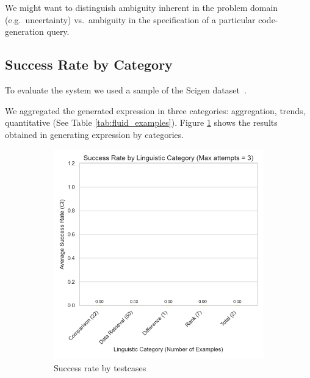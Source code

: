 We might want to distinguish ambiguity inherent in the problem domain (e.g.~uncertainty) vs.~ambiguity in the
specification of a particular code-generation query.

\subsection{Success Rate by Category}
To evaluate the system we used a sample of the Scigen dataset~\citep{scigen_dataset_2021}.

We aggregated the generated expression in three categories: aggregation, trends, quantitative (See Table \ref{tab:fluid_examples}).
Figure \ref{fig:success_rate_by_category} shows the results obtained in generating expression by categories.

\begin{figure}
    \centering
    \begin{subfigure}{0.48\linewidth}
        \centering
        \includegraphics[width=\linewidth]{fig/success_rate_by_category}
        \caption{Success rate by testcases}
        \label{fig:success_rate_by_category}
    \end{subfigure}\hfill
    \begin{subfigure}{0.48\linewidth}
        \centering

\end{subfigure}
\end{figure}
